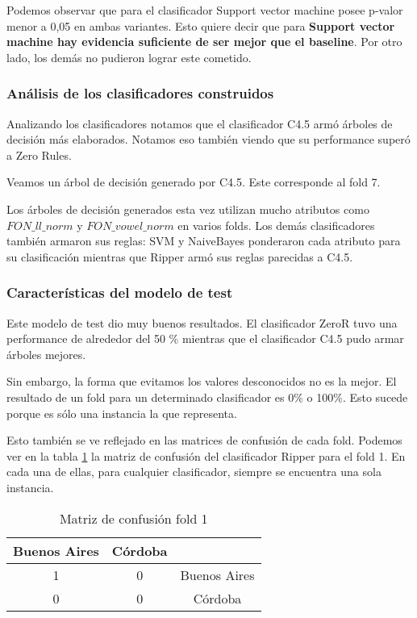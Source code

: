 Podemos observar que para el clasificador Support vector machine posee p-valor menor a 0,05 en ambas variantes. Esto quiere decir que para \textbf{Support vector machine hay evidencia suficiente de ser mejor que el baseline}. Por otro lado, los demás no pudieron lograr este cometido. 

\subsubsection{Análisis de los clasificadores construidos}

Analizando los clasificadores notamos que el clasificador C4.5 armó árboles de decisión más elaborados. Notamos eso también viendo que su performance superó a Zero Rules. 

Veamos un árbol de decisión generado por C4.5. Este corresponde al fold 7. 

Los árboles de decisión generados esta vez utilizan mucho  atributos como $FON\_ll\_norm$ y $FON\_vowel\_norm$ en varios folds. Los demás clasificadores también armaron sus reglas: SVM y NaiveBayes ponderaron cada atributo para su clasificación mientras que Ripper armó sus reglas parecidas a C4.5. 

\subsubsection{Características del modelo de test}

Este modelo de test dio muy buenos resultados. El clasificador ZeroR tuvo una performance de alrededor del 50 \% mientras que el clasificador C4.5 pudo armar árboles mejores. 

Sin embargo, la forma que evitamos los valores desconocidos no es la mejor. El resultado de un fold para un determinado clasificador es 0\% o 100\%. Esto sucede porque es sólo una instancia la que representa. 

Esto también se ve reflejado en las matrices de confusión de cada fold. Podemos ver en la tabla \ref{PAH_mat_conf_f1_solo0o1} la matriz de confusión del clasificador Ripper para el fold 1. En cada una de ellas, para cualquier clasificador, siempre se encuentra una sola instancia. 

\begin{table}[H]
	\centering
	\begin{tabular}{|c|c|c|}
		\hline
		Buenos Aires & Córdoba & \\ \hline
		1 & 0 & Buenos Aires\\ \hline
		0 & 0 & Córdoba\\ \hline
	\end{tabular}
	\caption{Matriz de confusión fold 1}
	\label{PAH_mat_conf_f1_solo0o1}
\end{table}



